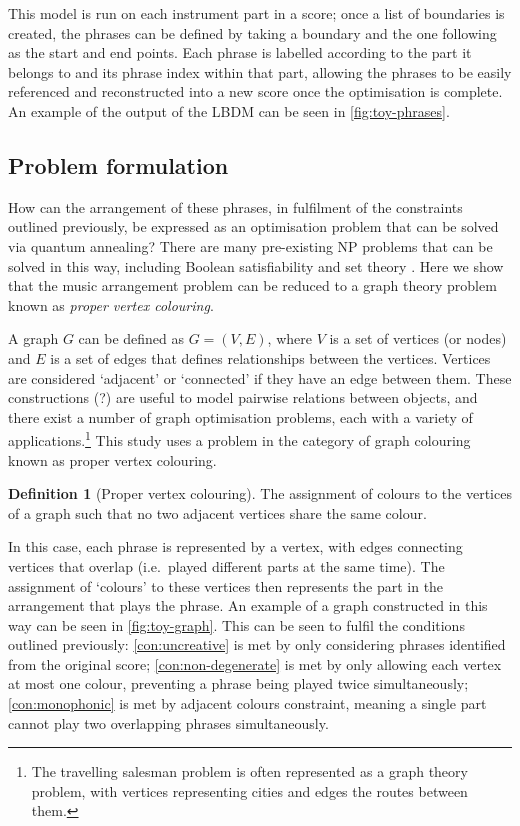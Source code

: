 \documentclass[12pt]{article}
\theoremstyle{definition}
\newtheorem*{definition}{Definition}
\begin{document}
This model is run on each instrument part in a score; once a list of boundaries is created, the phrases can be defined by taking a boundary and the one following as the start and end points. Each phrase is labelled according to the part it belongs to and its phrase index within that part, allowing the phrases to be easily referenced and reconstructed into a new score once the optimisation is complete. An example of the output of the LBDM can be seen in \cref{fig:toy-phrases}.

\subsection{Problem formulation}

How can the arrangement of these phrases, in fulfilment of the constraints outlined previously, be expressed as an optimisation problem that can be solved via quantum annealing? There are many pre-existing NP problems that can be solved in this way, including Boolean satisfiability and set theory \cite{lucas_ising_2014}. Here we show that the music arrangement problem can be reduced to a graph theory problem known as \emph{proper vertex colouring}.

A graph $G$ can be defined as $G=(V,E)$, where $V$ is a set of vertices (or nodes) and $E$ is a set of edges that defines relationships between the vertices. Vertices are considered `adjacent' or `connected' if they have an edge between them. These constructions (?) are useful to model pairwise relations between objects, and there exist a number of graph optimisation problems, each with a variety of applications.\footnote{The travelling salesman problem is often represented as a graph theory problem, with vertices representing cities and edges the routes between them.} This study uses a problem in the category of graph colouring known as proper vertex colouring.

\begin{definition}[Proper vertex colouring]
    The assignment of colours to the vertices of a graph such that no two adjacent vertices share the same colour.
\end{definition}

In this case, each phrase is represented by a vertex, with edges connecting vertices that overlap (i.e.\ played different parts at the same time). The assignment of `colours' to these vertices then represents the part in the arrangement that plays the phrase. An example of a graph constructed in this way can be seen in \cref{fig:toy-graph}. This can be seen to fulfil the conditions outlined previously: \cref{con:uncreative} is met by only considering phrases identified from the original score; \cref{con:non-degenerate} is met by only allowing each vertex at most one colour, preventing a phrase being played twice simultaneously; \cref{con:monophonic} is met by adjacent colours constraint, meaning a single part cannot play two overlapping phrases simultaneously. 
\end{document}
